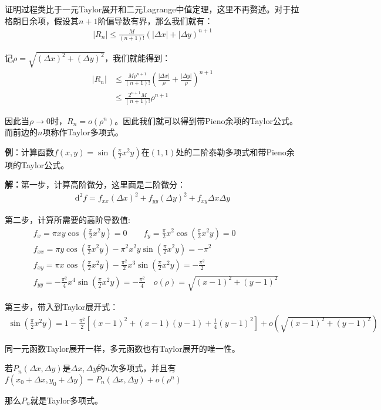 \documentclass{ctexart}
\let\oldtextbf\textbf %
\renewcommand{\textbf}[1]{\textcolor{btex}{\oldtextbf{#1}}} %
\begin{document}
证明过程类比于一元Taylor展开和二元Lagrange中值定理，这里不再赘述。对于拉格朗日余项，假设其$n+1$阶偏导数有界，那么我们就有：
\begin{align*}
    |R_n|\leq\frac{M}{(n+1)!}(|\Delta x|+|\Delta y)^{n+1}
\end{align*}

记$\rho=\sqrt{(\Delta x)^2+(\Delta y)^2}$，我们就能得到：
\begin{align*}
    |R_n|&\leq \frac{M\rho^{n+1}}{(n+1)!}(\frac{|\Delta x|}{\rho}+\frac{|\Delta y|}{\rho})^{n+1}\\
    &\leq \frac{2^{n+1}M}{(n+1)!}\rho^{n+1}
\end{align*}

因此当$\rho\to 0$时，$R_n=o(\rho^n)$。因此我们就可以得到带Pieno余项的Taylor公式。而前边的$n$项称作Taylor多项式。

\textbf{例}：计算函数$f(x,y)=\sin(\frac{\pi}{2}x^2y)$在$(1,1)$处的二阶泰勒多项式和带Pieno余项的Taylor公式。

\textbf{解：}第一步，计算高阶微分，这里面是二阶微分：
\begin{align*}
    \mathrm{d}^2f=f_{xx}(\Delta x)^2+f_{yy}(\Delta y)^2+f_{xy}\Delta x\Delta y
\end{align*}

第二步，计算所需要的高阶导数值:
\begin{align*}
    &f_x=\pi xy\cos(\frac{\pi}{2}x^2y)=0\qquad f_y=\frac{\pi}{2}x^2\cos(\frac{\pi}{2}x^2y)=0\\
    &f_{xx}=\pi y\cos(\frac{\pi}{2}x^2y)-\pi^2x^2y\sin(\frac{\pi}{2}x^2y)=-\pi^2\\
&f_{xy}= \pi x\cos(\frac{\pi}{2}x^2y)-\frac{\pi^2}{2}x^3\sin(\frac{\pi}{2}x^2y)=-\frac{\pi^2}{2}\\
&f_{yy}=-\frac{\pi^2}{4}x^4\sin(\frac{\pi}{2}x^2y)= -\frac{\pi^2}{4}\quad o(\rho)=\sqrt{(x-1)^2+(y-1)^2} 
\end{align*}

第三步，带入到Taylor展开式：
\begin{align*}
    \sin(\frac{\pi}{2}x^2y)=1-\frac{\pi^2}{2}[(x-1)^2+(x-1)(y-1)+\frac{1}{4}(y-1)^2]+o(\sqrt{(x-1)^2+(y-1)^2})
\end{align*}

同一元函数Taylor展开一样，多元函数也有Taylor展开的唯一性。
\begin{tcolorbox}[
    colback=bac2,     %
    colframe=fra2,   %
    coltitle=white,             %
    coltext=tex2,
    title=多元函数Taylor展开唯一性,
    fonttitle=\bfseries,        %
arc=3mm,                     %
breakable
]
若$P_n(\Delta x,\Delta y)$是$\Delta x,\Delta y$的$n$次多项式，并且有$f(x_0+\Delta x,y_0+\Delta y)=P_n(\Delta x,\Delta y)+o(\rho^n)$

那么$P_n$就是Taylor多项式。
\end{tcolorbox}
\end{document}

